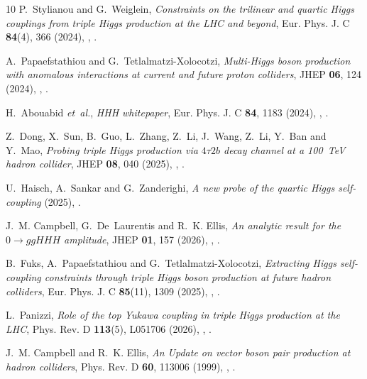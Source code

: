 \documentclass{SciPost}
\begin{document}
\begin{thebibliography}{10}
P.~Stylianou and G.~Weiglein,
\newblock \emph{{Constraints on the trilinear and quartic Higgs couplings from triple Higgs production at the LHC and beyond}},
\newblock Eur. Phys. J. C \textbf{84}(4), 366 (2024),
\newblock {},
\newblock {}.

A.~Papaefstathiou and G.~Tetlalmatzi-Xolocotzi,
\newblock \emph{{Multi-Higgs boson production with anomalous interactions at current and future proton colliders}},
\newblock JHEP \textbf{06}, 124 (2024),
\newblock {},
\newblock {}.

H.~Abouabid \emph{et~al.},
\newblock \emph{{HHH whitepaper}},
\newblock Eur. Phys. J. C \textbf{84}, 1183 (2024),
\newblock {},
\newblock {}.

Z.~Dong, X.~Sun, B.~Guo, L.~Zhang, Z.~Li, J.~Wang, Z.~Li, Y.~Ban and Y.~Mao,
\newblock \emph{{Probing triple Higgs production via $4\tau 2b$ decay channel at a 100~TeV hadron collider}},
\newblock JHEP \textbf{08}, 040 (2025),
\newblock {},
\newblock {}.

U.~Haisch, A.~Sankar and G.~Zanderighi,
\newblock \emph{{A new probe of the quartic Higgs self-coupling}}  (2025),
\newblock {}.

J.~M. Campbell, G.~De~Laurentis and R.~K. Ellis,
\newblock \emph{{An analytic result for the $0 \to ggHHH$ amplitude}},
\newblock JHEP \textbf{01}, 157 (2026),
\newblock {},
\newblock {}.

B.~Fuks, A.~Papaefstathiou and G.~Tetlalmatzi-Xolocotzi,
\newblock \emph{{Extracting Higgs self-coupling constraints through triple Higgs boson production at future hadron colliders}},
\newblock Eur. Phys. J. C \textbf{85}(11), 1309 (2025),
\newblock {},
\newblock {}.

L.~Panizzi,
\newblock \emph{{Role of the top Yukawa coupling in triple Higgs production at the LHC}},
\newblock Phys. Rev. D \textbf{113}(5), L051706 (2026),
\newblock {},
\newblock {}.

J.~M. Campbell and R.~K. Ellis,
\newblock \emph{{An Update on vector boson pair production at hadron colliders}},
\newblock Phys. Rev. D \textbf{60}, 113006 (1999),
\newblock {},
\newblock {}.


\end{thebibliography}
\end{document}
